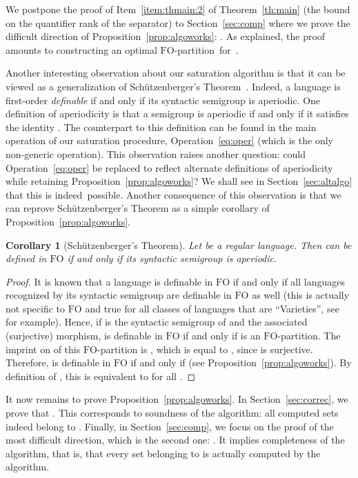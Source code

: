 \documentclass{CSML}
\newcommand{\fo}{\ensuremath{\text{FO}}\xspace}
\theoremstyle{plain}
\newtheorem{corollary}[thm]{Corollary}
\begin{document}
We postpone the proof of Item~\ref{item:thmain:2} of Theorem~\ref{th:main} (the
bound on the quantifier rank of the separator) to
Section~\ref{sec:comp} where we prove the difficult direction of
Proposition~\ref{prop:algoworks}: . As explained, the proof amounts to constructing an
optimal \fo-partition~for~.

\smallskip
Another interesting observation about our saturation algorithm is that
it can be viewed as a generalization of Schützenberger's
Theorem~\cite{sfo,mnpfo}. Indeed, a language is first-order
\emph{definable} if and only if its syntactic semigroup is aperiodic.
One definition of aperiodicity is that a semigroup is aperiodic if and
only if it satisfies the identity . The
counterpart to this definition can be found in the main operation of
our saturation procedure, Operation~\ref{eq:oper} (which is the only
non-generic operation). This observation raises another question:
could Operation~\ref{eq:oper} be replaced to reflect alternate
definitions of aperiodicity while retaining
Proposition~\ref{prop:algoworks}? We shall see in
Section~\ref{sec:altalgo} that this is indeed~possible. Another
consequence of this observation is that we can reprove
Schützenberger's Theorem as a simple corollary of
Proposition~\ref{prop:algoworks}.

\begin{corollary}[Schützenberger's Theorem] \label{cor:carac}
  Let  be a regular language. Then  can be defined in \fo if and
  only if its syntactic semigroup is aperiodic.
\end{corollary}

\begin{proof}
  It is known that a language is definable in \fo if and only if all
  languages recognized by its syntactic semigroup are definable in
  \fo as well (this is actually not specific to \fo and true for all
  classes of languages that are ``Varieties'', see~\cite{Pin13:MPRI} for
  example). Hence, if  is the syntactic semigroup of  and  the associated (surjective) morphism,  is definable in \fo if and only if
   is an \fo-partition. The imprint on
   of this \fo-partition is , which is equal to , since
   is surjective. Therefore,  is definable in \fo if and only if
   (see Proposition~\ref{prop:algoworks}). By definition
  of , this is equivalent to  for
  all .
\end{proof}

It now remains to prove Proposition~\ref{prop:algoworks}. In
Section~\ref{sec:correc}, we prove that . This corresponds to soundness of the algorithm: all
computed sets indeed belong to . Finally, in
Section~\ref{sec:comp}, we focus on the proof of the most difficult
direction, which is the second one: . It implies completeness of the algorithm, that is, that
every set belonging to  is actually computed by the algorithm.
\end{document}
